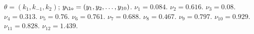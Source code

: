 \begin{algorithmic}
\Require $\theta=(k_1, k_{-1}, k_2)$; $y_{\lo} = (y_1, y_2, \dots, y_{10})$.
\State \Return $\nu_{1} = 0.084$.
\Else
{}
\State \Return $\nu_{2} = 0.616$.
\Else
{}\State \Return $\nu_{3} = 0.08$.
\Else
{}
\State \Return $\nu_{4} = 0.313$.
\Else
\State \Return $\nu_{5} = 0.76$.
\EndIf
\Else
{}
\State \Return $\nu_{6} = 0.761$.
\Else
{}
\State \Return $\nu_{7} = 0.688$.
\Else
\State \Return $\nu_{8} = 0.467$.
\EndIf
\Else
\State \Return $\nu_{9} = 0.797$.
\EndIf
\EndIf
\EndIf
\EndIf
\EndIf
\Else
{}
\State \Return $\nu_{10} = 0.929$.
\Else
\State \Return $\nu_{11} = 0.828$.
\EndIf
\Else
\State \Return $\nu_{12} = 1.439$.
\EndIf
\EndIf
\EndIf
\end{algorithmic}
